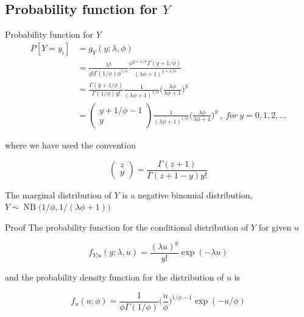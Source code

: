 \documentclass[aspectratio=169]{beamer}
\DeclareMathOperator{\NB}{NB}
\begin{document}
\hypertarget{probability-function-for-y}{%
\subsection{\texorpdfstring{Probability function for
\(Y\)}{Probability function for Y}}\label{probability-function-for-y}}

\begin{frame}{Probability function for \(Y\)}
\begin{equation} \label{eq:pdfMix}
  \begin{aligned}
    P[Y=y_i]&=g_{Y}(y;\lambda, \phi) \\
    &=\frac{\lambda^{y}}{y!\Gamma(1/\phi)\phi^{1/\phi}}\frac{\phi^{y+1/\phi}\Gamma(y+1/\phi)}{(\lambda \phi + 1)^{y+1/\phi}} \\
    &=\frac{\Gamma(y+1/\phi)}{\Gamma(1/\phi)y!}\frac{1}{(\lambda\phi+1)^{1/\phi}}\bigg(\frac{\lambda\phi}{\lambda\phi+1}\bigg)^{y} \\
    &=\begin{pmatrix} y+1/\phi-1 \\ y \end{pmatrix} \frac{1}{(\lambda\phi+1)^{1/\phi}}\bigg(\frac{\lambda\phi}{\lambda\phi+1}\bigg)^{y} \ , \ for \ y = 0, 1, 2, \dots
  \end{aligned}
\end{equation}

where we have used the convention

\begin{equation}
  \begin{pmatrix} z\\y \end{pmatrix} = \frac{\Gamma(z+1)}{\Gamma(z+1-y)y!}
\end{equation}

The marginal distribution of \(Y\) is a negative binomial distribution,
\(Y\sim \NB\big(1/\phi,1/(\lambda \phi+1)\big)\)
\end{frame}

\begin{frame}{Proof}
\protect\hypertarget{proof}{}
The probability function for the conditional distribution of \(Y\) for
given \(u\)

\begin{equation} \label{eq:pdfPois}
  f_{Y|u}(y;\lambda, u)=\frac{(\lambda u)^y}{y!} \exp (-\lambda u)
\end{equation}

and the probability density function for the distribution of \(u\) is

\begin{equation} \label{eq:pdfGamma}
  f_{u}(u;\phi)=\frac{1}{\phi \Gamma(1/\phi)} \bigg(\frac{u}{\phi}\bigg)^{1/\phi-1} \exp (-u/\phi)
\end{equation}
\end{frame}
\end{document}

